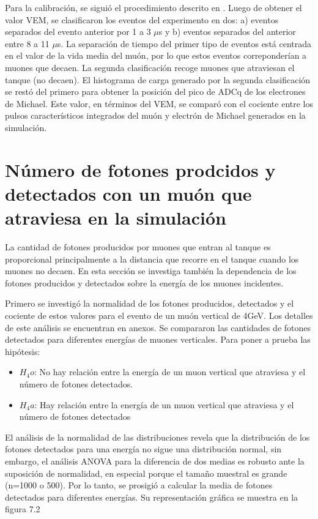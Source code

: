 \documentclass{book}
\begin{document}
Para la calibraci\'on, se sigui\'o el procedimiento descrito en \citep{ALLISON}. Luego de obtener el valor VEM, se clasificaron los eventos del experimento en dos: a) eventos separados del evento anterior por 1 a 3 $\mu$s y b) eventos separados del anterior entre 8 a 11 $\mu$s. La separaci\'on de tiempo del primer tipo de eventos est\'a centrada en el valor de la vida media del mu\'on, por lo que estos eventos correponder\'ian a muones que decaen. La segunda clasificaci\'on recoge muones que atraviesan el tanque (no decaen). El histograma de carga generado por la segunda clasificaci\'on se rest\'o del primero para obtener la posici\'on del pico de ADCq de los electrones de Michael. Este valor, en t\'erminos del VEM, se compar\'o con el cociente entre los pulsos caracter\'isticos integrados del mu\'on y electr\'on de Michael generados en la simulaci\'on.



\section{N\'umero de fotones prodcidos y detectados con un mu\'on que atraviesa en la simulaci\'on}

La cantidad de fotones producidos por muones que entran al tanque es proporcional principalmente a la distancia que recorre en el tanque cuando los  muones no decaen. En esta secci\'on se investiga tambi\'en la dependencia de los fotones producidos y detectados sobre la energ\'ia de los muones incidentes.

Primero se investig\'o la normalidad de los fotones producidos, detectados y el cociente de estos valores para el evento de un mu\'on vertical de 4GeV. Los detalles de este an\'alisis se encuentran en anexos. Se compararon las cantidades de fotones detectados para diferentes energ\'ias de muones verticales. Para poner a prueba las hip\'otesis:

\begin{itemize}
\item $H_4o$: No hay relaci\'on entre la energ\'ia de un muon vertical que atraviesa y el n\'umero de fotones detectados.
\item $H_4a$: Hay relaci\'on entre la energ\'ia de un muon vertical que atraviesa y el n\'umero de fotones detectados
\end{itemize}

El an\'alisis de la normalidad de las distribuciones revela que la distribuci\'on de los fotones detectados para una energ\'ia no sigue una distribuci\'on normal, sin embargo, el an\'alisis ANOVA para la diferencia de dos medias es robusto ante la suposici\'on de normalidad, en especial porque el tama\~no muestral es grande (n=1000 o 500). Por lo tanto, se prosigi\'o a calcular la media de fotones detectados para diferentes energ\'ias. Su representaci\'on gr\'afica se muestra en la figura 7.2
\end{document}

